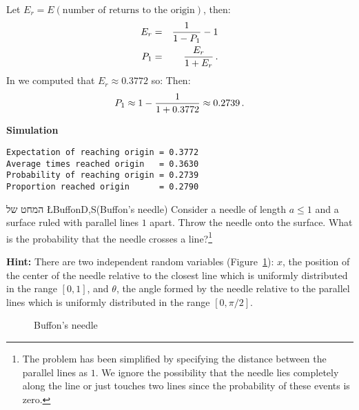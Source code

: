 Let $E_r=E(\textrm{number of returns to the origin})$, then:
\begin{eqnarray*}
E_r &=& \displaystyle\frac{1}{1-P_1} - 1\\
P_1&=& \displaystyle\frac{E_r}{1+E_r}\,.
\end{eqnarray*}
In  we computed that $E_r\approx 0.3772$ so:
Then:
\[
P_1 \approx 1- \displaystyle\frac{1}{1+0.3772}
\approx 0.2739\,.
\]

\textbf{Simulation}
\begin{verbatim}
Expectation of reaching origin = 0.3772
Average times reached origin   = 0.3630
Probability of reaching origin = 0.2739
Proportion reached origin      = 0.2790
\end{verbatim}


\begin{prob}{המחט של \L{Buffon}}{D,S}{(Buffon's needle)}
Consider a needle of length $a\leq 1$ and a surface ruled with parallel lines $1$ apart. Throw the needle onto the surface. What is the probability that the needle crosses a line?\footnote{The problem has been simplified by specifying the distance between the parallel lines as $1$. We ignore the possibility that the needle lies completely along the line or just touches two lines since the probability of these events is zero.}

\textbf{Hint:} There are two independent random variables (Figure~\ref{f.buffon1}): $x$, the position of the center of the needle relative to the closest line which is uniformly distributed in the range $[0,1]$, and $\theta$, the angle formed by the needle relative to the parallel lines which is uniformly distributed in the range $[0,\pi/2]$.

\begin{figure}[tb]
\begin{center}
\end{center}
\caption{Buffon's needle}\label{f.buffon1}
\end{figure}

\end{prob}

